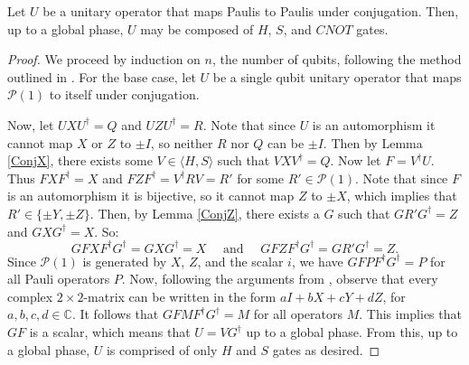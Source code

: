 \documentclass[12pt]{dalthesis}
\begin{document}
\begin{theorem}
\label{HSCNOT}
Let $U$ be a unitary operator that maps Paulis to Paulis under conjugation. Then, up to a global phase, $U$ may be composed of $H$, $S$, and $CNOT$ gates.
\end{theorem}
\begin{proof}
We proceed by induction on $n$, the number of qubits, following the method outlined in \cite{nielsen00}.
For the base case, let $U$ be a single qubit unitary operator that maps $\mathcal{P}(1)$ to itself under conjugation. 

Now, let $UXU^\dag = Q$ and $UZU^\dag = R$. Note that since $U$ is an automorphism it cannot map $X$ or $Z$ to $\pm I$, so neither $R$ nor $Q$ can be $\pm I$. Then by Lemma \ref{ConjX}, there exists some $V \in \langle H, S \rangle$ such that $VXV^\dag = Q$. Now let $F = V^\dag U$. Thus $FXF^\dag = X$ and $FZF^\dag = V^\dag R V = R'$ for some $R' \in \mathcal{P}(1)$. Note that since $F$ is an automorphism it is bijective, so it cannot map $Z$ to $\pm X$, which implies that $R' \in \{\pm Y, \pm Z \}$. Then, by Lemma \ref{ConjZ}, there exists a $G$ such that $GR'G^\dag = Z$ and $GXG^\dag = X$. So:
\[ 
G FXF^\dag G^\dag = G XG^\dag = X  \quad \mbox{ and } \quad
G FZF^\dag G^\dag = G R' G^\dag = Z.
\]
Since $\mathcal{P}(1)$ is generated by $X$, $Z$, and the scalar $i$, we have $GFPF^\dag G^\dag = P$ for all Pauli operators $P$. Now, following the arguments from \cite{Selinger_gen}, observe that every complex $2 \times 2$-matrix can be written in the form $aI + bX + cY + dZ$, for $a, b, c, d \in \mathbb{C}$. It follows that $GFMF^\dag G^\dag = M$ for all operators $M$. This implies that $GF$ is a scalar, which means that $U = VG^\dagger$ up to a global phase. From this, up to a global phase, $U$ is comprised of only $H$ and $S$ gates as desired.


\end{proof}
\end{document}
